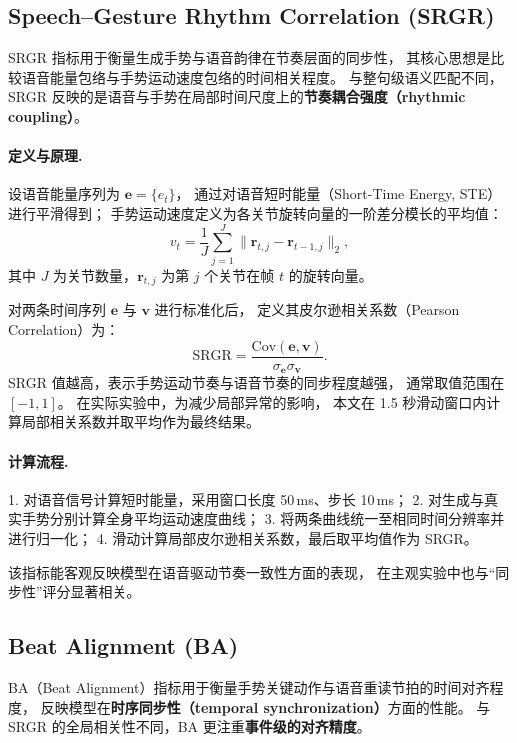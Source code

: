 \subsection{Speech–Gesture Rhythm Correlation (SRGR)}
\label{subsec:srgr}

SRGR 指标用于衡量生成手势与语音韵律在节奏层面的同步性，
其核心思想是比较语音能量包络与手势运动速度包络的时间相关程度。
与整句级语义匹配不同，
SRGR 反映的是语音与手势在局部时间尺度上的\textbf{节奏耦合强度（rhythmic coupling）}。

\paragraph{定义与原理.}
设语音能量序列为 $\bm{e} = \{ e_t \}$，
通过对语音短时能量（Short-Time Energy, STE）进行平滑得到；
手势运动速度定义为各关节旋转向量的一阶差分模长的平均值：
\begin{equation}
v_t = \frac{1}{J}\sum_{j=1}^{J} \|\bm{r}_{t,j} - \bm{r}_{t-1,j}\|_2,
\end{equation}
其中 $J$ 为关节数量，$\bm{r}_{t,j}$ 为第 $j$ 个关节在帧 $t$ 的旋转向量。

对两条时间序列 $\bm{e}$ 与 $\bm{v}$ 进行标准化后，
定义其皮尔逊相关系数（Pearson Correlation）为：
\begin{equation}
\mathrm{SRGR} = \frac{\mathrm{Cov}(\bm{e}, \bm{v})}{\sigma_{\bm{e}}\sigma_{\bm{v}}}.
\end{equation}
SRGR 值越高，表示手势运动节奏与语音节奏的同步程度越强，
通常取值范围在 $[-1, 1]$。
在实际实验中，为减少局部异常的影响，
本文在 1.5 秒滑动窗口内计算局部相关系数并取平均作为最终结果。

\paragraph{计算流程.}
1. 对语音信号计算短时能量，采用窗口长度 50\,ms、步长 10\,ms；  
2. 对生成与真实手势分别计算全身平均运动速度曲线；  
3. 将两条曲线统一至相同时间分辨率并进行归一化；  
4. 滑动计算局部皮尔逊相关系数，最后取平均值作为 SRGR。

该指标能客观反映模型在语音驱动节奏一致性方面的表现，
在主观实验中也与“同步性”评分显著相关。

\subsection{Beat Alignment (BA)}
\label{subsec:ba}

BA（Beat Alignment）指标用于衡量手势关键动作与语音重读节拍的时间对齐程度，
反映模型在\textbf{时序同步性（temporal synchronization）}方面的性能。
与 SRGR 的全局相关性不同，BA 更注重\textbf{事件级的对齐精度}。

